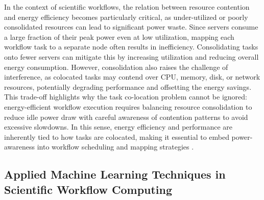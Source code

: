 In the context of scientific workflows, the relation between resource contention and energy efficiency becomes particularly critical, as under-utilized or poorly consolidated resources can lead to significant power waste. Since servers consume a large fraction of their peak power even at low utilization, mapping each workflow task to a separate node often results in inefficiency. Consolidating tasks onto fewer servers can mitigate this by increasing utilization and reducing overall energy consumption. However, consolidation also raises the challenge of interference, as colocated tasks may contend over CPU, memory, disk, or network resources, potentially degrading performance and offsetting the energy savings. This trade-off highlights why the task co-location problem cannot be ignored: energy-efficient workflow execution requires balancing resource consolidation to reduce idle power draw with careful awareness of contention patterns to avoid excessive slowdowns. In this sense, energy efficiency and performance are inherently tied to how tasks are colocated, making it essential to embed power-awareness into workflow scheduling and mapping strategies \cite{5644899} \cite{Lee2012}.

\subsection{Applied Machine Learning Techniques in Scientific Workflow Computing}
\label{sec:background_ml}

